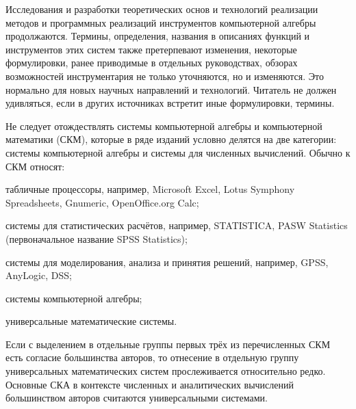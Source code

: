 Исследования и разработки теоретических основ и технологий реализации методов и программных реализаций инструментов компьютерной алгебры продолжаются. Термины, определения, названия в описаниях функций и инструментов этих систем также претерпевают изменения, некоторые формулировки, ранее приводимые в отдельных руководствах, обзорах возможностей инструментария не только уточняются, но и изменяются. Это нормально для новых научных направлений и технологий. Читатель не должен удивляться, если в других источниках встретит иные формулировки, термины.

Не следует отождествлять системы компьютерной алгебры и компьютерной математики (СКМ), которые в ряде изданий условно делятся на две категории: системы компьютерной алгебры и системы для численных вычислений. Обычно к СКМ относят:
\begin{textitemize}
	\item табличные процессоры, например, Microsoft Excel, Lotus Symphony Spreadsheets, Gnumeric, OpenOffice.org Calc;
	\item системы для статистических расчётов, например, STATISTICA, PASW Statistics (первоначальное название SPSS Statistics);
	\item системы для моделирования, анализа и принятия решений, например, GPSS, AnyLogic, DSS;
	\item системы компьютерной алгебры;
	\item универсальные математические системы.
\end{textitemize}

Если с выделением в отдельные группы первых трёх из перечисленных СКМ есть согласие большинства авторов, то отнесение в отдельную группу универсальных математических систем прослеживается относительно редко. Основные СКА в контексте численных и аналитических вычислений большинством авторов считаются универсальными системами.

